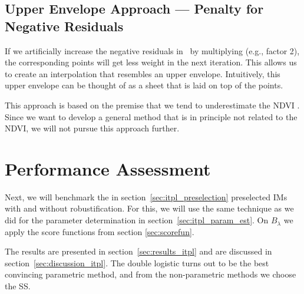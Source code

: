 {	\subsection{Upper Envelope Approach --- Penalty for Negative Residuals}
		If we artificially increase the negative residuals in~ by multiplying (e.g., factor 2), the corresponding points will get less weight in the next iteration. This allows us to create an interpolation that resembles an upper envelope. Intuitively, this upper envelope can be thought of as a sheet that is laid on top of the points.
			
		This approach is based on the premise that we tend to underestimate the NDVI \citep{caoSimpleMethodImprove2018b}. Since we want to develop a general method that is in principle not related to the NDVI, we will not pursue this approach further.	
}
\section{Performance Assessment}{\label{sec:itpl_perfomance_assessment}
	Next, we will benchmark the in section~\ref{sec:itpl_preselection} preselected {{IM}}s with and without robustification. For this, we will use the same technique as we did for the parameter determination in section~\ref{sec:itpl_param_est}. On $B_\lambda$ we apply the score functions from section \ref{sec:scorefun}.  

	The results are presented in section~\ref{sec:results_itpl} and are discussed in section~\ref{sec:discussion_itpl}. The double logistic turns out to be the best convincing parametric method, and from the non-parametric methods we choose the SS.
}


